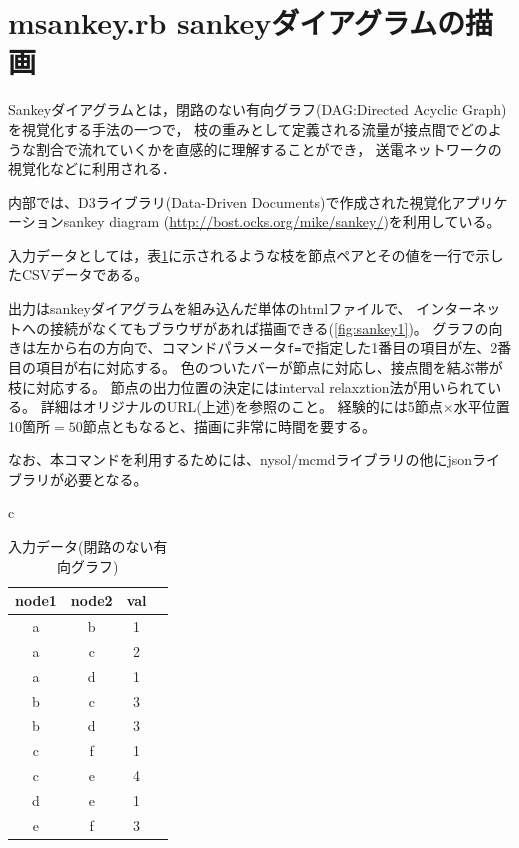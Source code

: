 


\section{msankey.rb sankeyダイアグラムの描画\label{sect:msankey}}
Sankeyダイアグラムとは，閉路のない有向グラフ(DAG:Directed Acyclic Graph)を視覚化する手法の一つで，
枝の重みとして定義される流量が接点間でどのような割合で流れていくかを直感的に理解することができ，
送電ネットワークの視覚化などに利用される．

内部では、D3ライブラリ(Data-Driven Documents)で作成された視覚化アプリケーションsankey diagram
(\url{http://bost.ocks.org/mike/sankey/})を利用している。

入力データとしては，表\ref{tbl:sankey_input1}に示されるような枝を節点ペアとその値を一行で示したCSVデータである。

出力はsankeyダイアグラムを組み込んだ単体のhtmlファイルで、
インターネットへの接続がなくてもブラウザがあれば描画できる(\ref{fig:sankey1})。
グラフの向きは左から右の方向で、コマンドパラメータ\verb|f=|で指定した1番目の項目が左、2番目の項目が右に対応する。
色のついたバーが節点に対応し、接点間を結ぶ帯が枝に対応する。
節点の出力位置の決定にはinterval relaxztion法が用いられている。
詳細はオリジナルのURL(上述)を参照のこと。
経験的には5節点$\times$水平位置10箇所$=50$節点ともなると、描画に非常に時間を要する。

なお、本コマンドを利用するためには、nysol/mcmdライブラリの他にjsonライブラリが必要となる。

\begin{table}[htbp]
\begin{center}
\begin{tabular}{c}

\begin{minipage}{0.12\hsize}
\begin{center}
\caption{入力データ(閉路のない有向グラフ)\label{tbl:sankey_input1}}
{\small
\begin{tabular}{cccc}
\hline
node1&node2&val\\
\hline
a&b&1\\
a&c&2\\
a&d&1\\
b&c&3\\
b&d&3\\
c&f&1\\
c&e&4\\
d&e&1\\
e&f&3\\
\hline
\end{tabular} 
}
\end{center}
\end{minipage}

\end{tabular} 
\end{center}
\end{table} 


